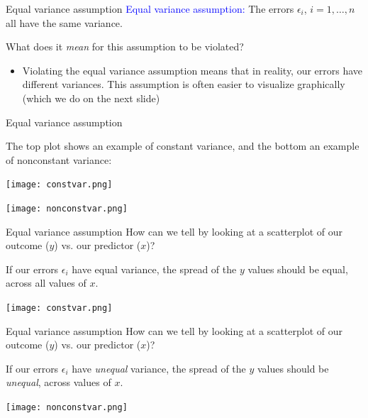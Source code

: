 \documentclass[10pt,t]{beamer}
\begin{document}
\begin{frame}{Equal variance assumption}
\textcolor{blue}{Equal variance assumption:} The errors $\epsilon_i$, $i = 1, \dots, n$ all have the same variance.

\vspace{0.3cm}

What does it \textit{mean} for this assumption to be violated?

\begin{itemize}
	\item[] Violating the equal variance assumption means that in reality, our errors have different variances. This assumption is often easier to visualize graphically (which we do on the next slide)
\end{itemize}

\end{frame}

\begin{frame}{Equal variance assumption}

The top plot shows an example of constant variance, and the bottom an example of nonconstant variance:

\vspace{0.3cm}

\centering

\texttt{[image: constvar.png]}

\texttt{[image: nonconstvar.png]}

\end{frame}

\begin{frame}{Equal variance assumption}
How can we tell by looking at a scatterplot of our outcome ($y$) vs. our predictor ($x$)?

\vspace{0.3cm}

If our errors $\epsilon_i$ have equal variance, the spread of the $y$ values should be equal, across all values of $x$.

\vspace{0.3cm}
\centering

\texttt{[image: constvar.png]}

\end{frame}

\begin{frame}{Equal variance assumption}
How can we tell by looking at a scatterplot of our outcome ($y$) vs. our predictor ($x$)?

\vspace{0.3cm}

If our errors $\epsilon_i$ have \textit{unequal} variance, the spread of the $y$ values should be \textit{unequal}, across values of $x$.

\vspace{0.3cm}
\centering

\texttt{[image: nonconstvar.png]}

\end{frame}
\end{document}
